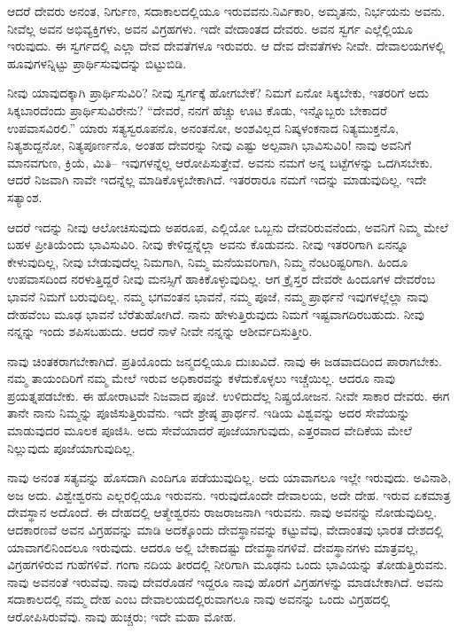 ಆದರೆ ದೇವರು ಅನಂತ, ನಿರ್ಗುಣ, ಸದಾಕಾಲದಲ್ಲಿಯೂ ಇರುವವನು.\break ನಿರ್ವಿಕಾರಿ, ಅಮೃತನು, ನಿರ್ಭಯನು ಅವನು. ನೀವೆಲ್ಲ ಅವನ ಅಭಿವ್ಯಕ್ತಿಗಳು, ಅವನ ವಿಗ್ರಹಗಳು. ಇದೇ ವೇದಾಂತದ ದೇವರು. ಅವನ ಸ್ವರ್ಗ ಎಲ್ಲೆಲ್ಲಿಯೂ ಇರುವುದು. ಈ ಸ್ವರ್ಗದಲ್ಲಿ ಎಲ್ಲಾ ದೇವ ದೇವತೆಗಳೂ ಇರುವರು. ಆ ದೇವ ದೇವತೆಗಳು ನೀವೇ. ದೇವಾಲಯಗಳಲ್ಲಿ ಹೂವುಗಳನ್ನಿಟ್ಟು ಪ್ರಾರ್ಥಿಸುವುದನ್ನು ಬಿಟ್ಟುಬಿಡಿ.

ನೀವು ಯಾವುದಕ್ಕಾಗಿ ಪ್ರಾರ್ಥಿಸುವಿರಿ? ನೀವು ಸ್ವರ್ಗಕ್ಕೆ ಹೋಗಬೇಕೆ? ನಿಮಗೆ ಏನೋ ಸಿಕ್ಕಬೇಕು, ಇತರರಿಗೆ ಅದು ಸಿಕ್ಕಬಾರದೆಂದು ಪ್ರಾರ್ಥಿಸುವಿರೇನು? “ದೇವರೆ, ನನಗೆ ಹೆಚ್ಚು ಊಟ ಕೊಡು, ಇನ್ನೊಬ್ಬರು ಬೇಕಾದರೆ ಉಪವಾಸವಿರಲಿ.'' ಯಾರು ಸತ್ಯಸ್ವರೂಪನೊ, ಅನಂತನೋ, ಅಂಶವಿಲ್ಲದ ನಿಷ್ಕಳಂಕನಾದ ನಿತ್ಯಮುಕ್ತನೊ, ನಿತ್ಯಶುದ್ದನೋ, ನಿತ್ಯಪೂರ್ಣನೊ, ಅಂತಹ ದೇವರನ್ನು ನೀವು ಎಷ್ಟು ಅಲ್ಪವಾಗಿ ಭಾವಿಸುವಿರಿ! ನಾವು ಅವನಿಗೆ ಮಾನವಗುಣ, ಕ್ರಿಯೆ, ಮಿತಿ– ಇವುಗಳನ್ನೆಲ್ಲ ಆರೋಪಿಸುತ್ತೇವೆ. ಅವನು ನಮಗೆ ಅನ್ನ ಬಟ್ಟೆಗಳನ್ನು ಒದಗಿಸಬೇಕು. ಆದರೆ ನಿಜವಾಗಿ ನಾವೇ ಇದನ್ನೆಲ್ಲ ಮಾಡಿಕೊಳ್ಳಬೇಕಾಗಿದೆ. ಇತರರಾರೂ ನಮಗೆ ಇದನ್ನು ಮಾಡುವುದಿಲ್ಲ. ಇದೇ ಸತ್ಯಾಂಶ.

ಆದರೆ ಇದನ್ನು ನೀವು ಆಲೋಚಿಸುವುದು ಅಪರೂಪ, ಎಲ್ಲಿಯೋ ಒಬ್ಬನು ದೇವರಿರುವನೆಂದು, ಅವನಿಗೆ ನಿಮ್ಮ ಮೇಲೆ ಬಹಳ ಪ್ರೀತಿಯೆಂದು ಭಾವಿಸುವಿರಿ. ನೀವು ಕೇಳಿದ್ದನ್ನೆಲ್ಲಾ ಅವನು ಕೊಡುವನು. ನೀವು ಇತರರಿಗಾಗಿ ಏನನ್ನೂ ಕೇಳುವುದಿಲ್ಲ, ನೀವು ಬೇಡುವುದೆಲ್ಲ ನಿಮಗಾಗಿ, ನಿಮ್ಮ ಮನೆಯವರಿಗಾಗಿ, ನಿಮ್ಮ ನೆಂಟರಿಷ್ಟರಿಗಾಗಿ. ಹಿಂದೂ ಉಪವಾಸದಿಂದ ನರಳುತ್ತಿದ್ದರೆ ನೀವು ಮನಸ್ಸಿಗೆ ಹಾಕಿಕೊಳ್ಳುವುದಿಲ್ಲ. ಆಗ ಕ್ರೈಸ್ತರ ದೇವರೇ ಹಿಂದೂಗಳ ದೇವರೆಂಬ ಭಾವನೆ ನಿಮಗೆ ಬರುವುದಿಲ್ಲ. ನಮ್ಮ ಭಗವಂತನ ಭಾವನೆ, ನಮ್ಮ ಪೂಜೆ, ನಮ್ಮ ಪ್ರಾರ್ಥನೆ ಇವುಗಳಲ್ಲೆಲ್ಲಾ ನಾವು ದೇಹವೆಂಬ ಮೂಢ ಭಾವನೆ ಬೆರೆತುಹೋಗಿದೆ. ನಾನು ಹೇಳುತ್ತಿರುವುದು ನಿಮಗೆ ಇಷ್ಟವಾಗದಿರಬಹುದು. ನೀವು ನನ್ನನ್ನು ಇಂದು ಶಪಿಸಬಹುದು. ಆದರೆ ನಾಳೆ ನೀವೇ ನನ್ನನ್ನು ಆಶೀರ್ವದಿಸುತ್ತೀರಿ.

ನಾವು ಚಿಂತಕರಾಗಬೇಕಾಗಿದೆ. ಪ್ರತಿಯೊಂದು ಜನ್ಮದಲ್ಲಿಯೂ ದುಃಖವಿದೆ. ನಾವು ಈ ಜಡವಾದದಿಂದ ಪಾರಾಗಬೇಕು. ನಮ್ಮ ತಾಯಂದಿರಿಗೆ ನಮ್ಮ ಮೇಲೆ ಇರುವ ಅಧಿಕಾರವನ್ನು ಕಳೆದುಕೊಳ್ಳಲು ಇಚ್ಚೆಯಿಲ್ಲ. ಆದರೂ ನಾವು ಪ್ರಯತ್ನಪಡಬೇಕು. ಈ ಹೋರಾಟವೇ ನಿಜವಾದ ಪೂಜೆ. ಉಳಿದುದೆಲ್ಲ ನಿಷ್ಪ್ರಯೋಜನ. ನೀವೇ ಸಾಕಾರ ದೇವರು. ಈಗ ತಾನೇ ನಾನು ನಿಮ್ಮನ್ನು ಪೂಜಿಸುತ್ತಿರುವೆನು. ಇದೇ ಶ್ರೇಷ್ಠ ಪ್ರಾರ್ಥನೆ. ಇಡಿಯ ವಿಶ್ವವನ್ನು ಅದರ ಸೇವೆಯನ್ನು ಮಾಡುವುದರ ಮೂಲಕ ಪೂಜಿಸಿ. ಅದು ಸೇವೆಯಾದರೆ ಪೂಜೆಯಾಗುವುದು, ಎತ್ತರವಾದ ವೇದಿಕೆಯ ಮೇಲೆ ನಿಲ್ಲುವುದು ಪೂಜೆಯಾಗುವುದಿಲ್ಲ.

ನಾವು ಅನಂತ ಸತ್ಯವನ್ನು ಹೊಸದಾಗಿ ಎಂದಿಗೂ ಪಡೆಯುವುದಿಲ್ಲ. ಅದು ಯಾವಾಗಲೂ ಇಲ್ಲೇ ಇರುವುದು. ಅವಿನಾಶಿ, ಅಜ ಅದು. ವಿಶ್ವೇಶ್ವರನು ಎಲ್ಲರಲ್ಲಿಯೂ ಇರುವನು. ಇರುವುದೊಂದೇ ದೇವಾಲಯ, ಅದೇ ದೇಹ. ಇರುವ ಏಕಮಾತ್ರ ದೇವಸ್ಥಾನ ಅದೊಂದೆ. ಈ ದೇಹದಲ್ಲಿ ಆತ್ಮೇಶ್ವರನು ರಾಜರಾಜನಾಗಿ ಇರುವನು. ನಾವು ಅವನನ್ನು ನೋಡುವುದಿಲ್ಲ. ಆದಕಾರಣವೆ ಅವನ ವಿಗ್ರಹವನ್ನು ಮಾಡಿ ಅದಕ್ಕೊಂದು ದೇವಸ್ಥಾನವನ್ನು ಕಟ್ಟುವೆವು, ವೇದಾಂತವು ಭಾರತ ದೇಶದಲ್ಲಿ ಯಾವಾಗಲಿನಿಂದಲೂ ಇರುವುದು. ಆದರೂ ಅಲ್ಲಿ ಬೇಕಾದಷ್ಟು ದೇವಸ್ಥಾನಗಳಿವೆ. ದೇವಸ್ಥಾನಗಳು ಮಾತ್ರವಲ್ಲ, ವಿಗ್ರಹಗಳಿರುವ ಗುಹೆಗಳಿವೆ. ಗಂಗಾ ನದಿಯ ತೀರದಲ್ಲಿ ನೀರಿಗಾಗಿ ಮೂಢನು ಒಂದು ಭಾವಿಯನ್ನು ತೋಡುತ್ತಿರುವನು. ನಾವು ಅವನಂತೆ ಇರುವೆವು. ನಾವು ದೇವರೊಡನೆ ಇದ್ದರೂ ನಾವು ಹೊರಗೆ ವಿಗ್ರಹಗಳನ್ನು ಮಾಡಬೇಕಾಗಿದೆ. ಅವನು ಸದಾಕಾಲದಲ್ಲಿ ನಮ್ಮ ದೇಹ ಎಂಬ ದೇವಾಲಯದಲ್ಲಿರುವಾಗಲೂ ನಾವು ಅವನನ್ನು ಒಂದು ವಿಗ್ರಹದಲ್ಲಿ ಆರೋಪಿಸಿರುವೆವು. ನಾವು ಹುಚ್ಚರು; ಇದೇ ಮಹಾ ಮೋಹ.

